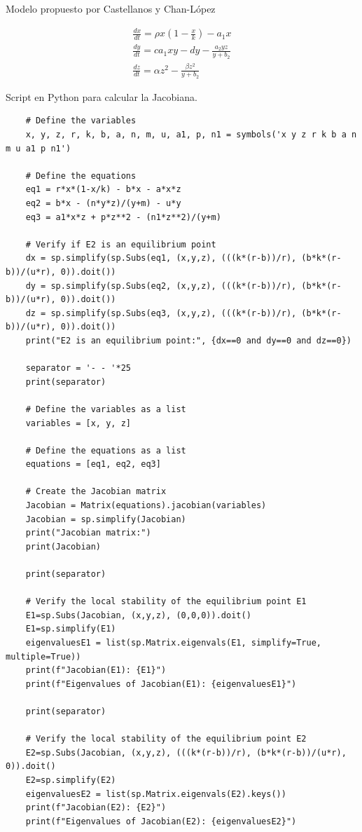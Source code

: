 \documentclass{wscpaperproc}
\theoremstyle{wsc}
\begin{document}
\begin{center}
	Modelo propuesto por Castellanos y Chan-López
\end{center}
\begin{equation} \label{Holling1y2_Castellanos}
	\begin{gathered}
		\frac{d x}{d t}=\rho x\left(1-\frac{x}{k}\right)-a_1 x \\
		\frac{d y}{d t}=c a_1 x y-d y-\frac{a_2 y z}{y+b_2} \\
		\frac{d z}{d t}=\alpha z^2-\frac{\beta z^2}{y+b_2}
	\end{gathered}
\end{equation}

\begin{center}
	Script en Python para calcular la Jacobiana.
\end{center}
\begin{verbatim}
	# Define the variables
	x, y, z, r, k, b, a, n, m, u, a1, p, n1 = symbols('x y z r k b a n m u a1 p n1')
	
	# Define the equations
	eq1 = r*x*(1-x/k) - b*x - a*x*z
	eq2 = b*x - (n*y*z)/(y+m) - u*y
	eq3 = a1*x*z + p*z**2 - (n1*z**2)/(y+m)
	
	# Verify if E2 is an equilibrium point
	dx = sp.simplify(sp.Subs(eq1, (x,y,z), (((k*(r-b))/r), (b*k*(r-b))/(u*r), 0)).doit())
	dy = sp.simplify(sp.Subs(eq2, (x,y,z), (((k*(r-b))/r), (b*k*(r-b))/(u*r), 0)).doit())
	dz = sp.simplify(sp.Subs(eq3, (x,y,z), (((k*(r-b))/r), (b*k*(r-b))/(u*r), 0)).doit())
	print("E2 is an equilibrium point:", {dx==0 and dy==0 and dz==0})
	
	separator = '- - '*25
	print(separator)
	
	# Define the variables as a list
	variables = [x, y, z]
	
	# Define the equations as a list
	equations = [eq1, eq2, eq3]
	
	# Create the Jacobian matrix
	Jacobian = Matrix(equations).jacobian(variables)
	Jacobian = sp.simplify(Jacobian)
	print("Jacobian matrix:")
	print(Jacobian)
	
	print(separator)
	
	# Verify the local stability of the equilibrium point E1
	E1=sp.Subs(Jacobian, (x,y,z), (0,0,0)).doit()
	E1=sp.simplify(E1)
	eigenvaluesE1 = list(sp.Matrix.eigenvals(E1, simplify=True, multiple=True))
	print(f"Jacobian(E1): {E1}")
	print(f"Eigenvalues of Jacobian(E1): {eigenvaluesE1}")
	
	print(separator)
	
	# Verify the local stability of the equilibrium point E2
	E2=sp.Subs(Jacobian, (x,y,z), (((k*(r-b))/r), (b*k*(r-b))/(u*r), 0)).doit()
	E2=sp.simplify(E2)
	eigenvaluesE2 = list(sp.Matrix.eigenvals(E2).keys())
	print(f"Jacobian(E2): {E2}")
	print(f"Eigenvalues of Jacobian(E2): {eigenvaluesE2}")
	

\end{verbatim}
\end{document}
